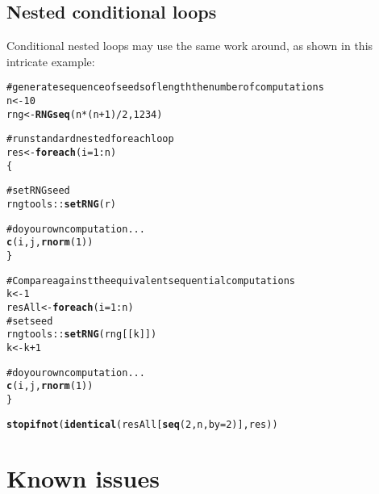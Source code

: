 \documentclass[a4paper,12pt]{article}\usepackage{graphicx, color}
\makeatletter
\newcommand{\hlfunctioncall}[1]{\textcolor[rgb]{0.501960784313725,0,0.329411764705882}{\textbf{#1}}}%
\newcommand{\hlcomment}[1]{\textcolor[rgb]{0.180392156862745,0.6,0.341176470588235}{#1}}%
\newenvironment{kframe}{%
 \def\at@end@of@kframe{}%
 \ifinner\ifhmode%
  \def\at@end@of@kframe{\end{minipage}}%
  \begin{minipage}{\columnwidth}%
 \fi\fi%
 \def\FrameCommand##1{\hskip\@totalleftmargin \hskip-\fboxsep
 \colorbox{shadecolor}{##1}\hskip-\fboxsep
     \hskip-\linewidth \hskip-\@totalleftmargin \hskip\columnwidth}%
 \MakeFramed {\advance\hsize-\width
   \@totalleftmargin\z@ \linewidth\hsize
   \@setminipage}}%
 {\par\unskip\endMakeFramed%
 \at@end@of@kframe}
\newenvironment{knitrout}{}{} %
\renewenvironment{knitrout}{\begin{footnotesize}}{\end{footnotesize}}
\makeatother
\begin{document}
\subsection{Nested conditional loops}

Conditional nested loops may use the same work around, as shown in this intricate 
example:

\begin{knitrout}
\color{fgcolor}\begin{kframe}
\begin{alltt}
\hlcomment{# generate sequence of seeds of length the number of computations}
n <- 10
rng <- \hlfunctioncall{RNGseq}(n * (n + 1)/2, 1234)

\hlcomment{# run standard nested foreach loop}
res <- \hlfunctioncall{foreach}(i = 1:n) %:% \hlfunctioncall{when}(i%%2 == 0) %:% \hlfunctioncall{foreach}(j = 1:i, r = rng[(i - 1) * i/2 + 1:i]) %dopar% 
    \{
        
\hlcomment{        # set RNG seed}
        rngtools::\hlfunctioncall{setRNG}(r)
        
\hlcomment{        # do your own computation ...}
        \hlfunctioncall{c}(i, j, \hlfunctioncall{rnorm}(1))
    \}

\hlcomment{# Compare against the equivalent sequential computations}
k <- 1
resAll <- \hlfunctioncall{foreach}(i = 1:n) %:% \hlfunctioncall{foreach}(j = 1:i) %do% \{
\hlcomment{    # set seed}
    rngtools::\hlfunctioncall{setRNG}(rng[[k]])
    k <- k + 1
    
\hlcomment{    # do your own computation ...}
    \hlfunctioncall{c}(i, j, \hlfunctioncall{rnorm}(1))
\}

\hlfunctioncall{stopifnot}(\hlfunctioncall{identical}(resAll[\hlfunctioncall{seq}(2, n, by = 2)], res))
\end{alltt}
\end{kframe}
\end{knitrout}


\section{Known issues}
\label{sec:issues}
\end{document}
